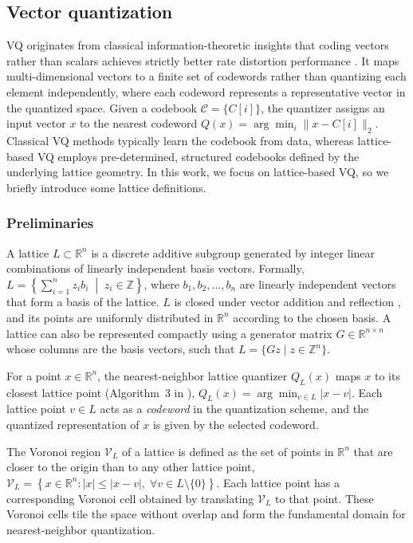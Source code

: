 \documentclass{article}
\theoremstyle{definition}
\theoremstyle{remark}
\begin{document}
\subsection{Vector quantization}
VQ originates from classical information-theoretic insights that coding vectors rather than scalars achieves strictly better rate distortion performance \cite{gray1984vector}. It maps multi-dimensional vectors to a finite set of codewords rather than quantizing each element independently, where each codeword represents a representative vector in the quantized space. Given a codebook $\mathcal{C} = \{C[i]\}$, the quantizer assigns an input vector $x$ to the nearest codeword $
Q(x) = \arg\min_{i} \| x - C[i] \|_2$. Classical VQ methods typically learn the codebook from data, whereas lattice-based VQ employs pre-determined, structured codebooks defined by the underlying lattice geometry. In this work, we focus on lattice-based VQ, so we briefly introduce some lattice definitions.

\subsubsection{Preliminaries}
A lattice $L \subset \mathbb{R}^n$ is a discrete additive subgroup generated by integer linear combinations of linearly independent basis vectors. Formally,
$L = \left\{ \sum_{i=1}^{n} z_i b_i \;\middle|\; z_i \in \mathbb{Z} \right\}$,
where $b_1, b_2, \ldots, b_n$ are linearly independent vectors that form a basis of the lattice. $L$ is closed under vector addition and reflection \cite{zamir2014lattice}, and its points are uniformly distributed in $\mathbb{R}^n$ according to the chosen basis. A lattice can also be represented compactly using a generator matrix $G \in \mathbb{R}^{n \times n}$ whose columns are the basis vectors, such that $L = \{ G z \mid z \in \mathbb{Z}^n \}$.


For a point $x \in \mathbb{R}^n$, the nearest-neighbor lattice quantizer $Q_L(x)$ maps $x$ to its closest lattice point (Algorithm~3 in \cite{conway2003fast}),
$Q_L(x) = \arg\min_{v \in L}| x - v|$. Each lattice point $v \in L$ acts as a \emph{codeword} in the quantization scheme, and the quantized representation of $x$ is given by the selected codeword.

The Voronoi region $\mathcal{V}_L$ of a lattice is defined as the set of points in $\mathbb{R}^n$ that are closer to the origin than to any other lattice point,
$\mathcal{V}_L = \left\{ x \in \mathbb{R}^n : | x | \le | x - v |,\; \forall v \in L \setminus \{0\} \right\}$. Each lattice point has a corresponding Voronoi cell obtained by translating $\mathcal{V}_L$ to that point. These Voronoi cells tile the space without overlap and form the fundamental domain for nearest-neighbor quantization.
\end{document}
